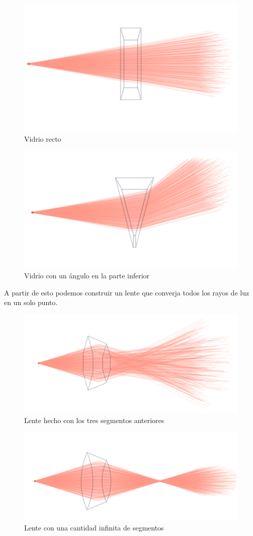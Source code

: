 \documentclass{article}
\begin{document}
\begin{figure}[H]
	\centering
	\includegraphics[width=0.65\linewidth]{Figuras/Lens_2}
	\caption{Vidrio recto}
	\label{fig:lens2}
\end{figure}

\begin{figure}[H]
	\centering
	\includegraphics[width=0.65\linewidth]{Figuras/Lens_3}
	\caption{Vidrio con un ángulo en la parte inferior}
	\label{fig:lens3}
\end{figure}

A partir de esto podemos construir un lente que converja todos los rayos de luz en un solo punto.

\begin{figure}[H]
	\centering
	\includegraphics[width=0.65\linewidth]{Figuras/Lens_3_Segments}
	\caption{Lente hecho con los tres segmentos anteriores}
	\label{fig:lens3segments}
\end{figure}

\begin{figure}[H]
	\centering
	\includegraphics[width=0.65\linewidth]{Figuras/Lens_Infinity_Segments}
	\caption{Lente con una cantidad infinita de segmentos}
	\label{fig:lensinfinitysegments}
\end{figure}
\end{document}
